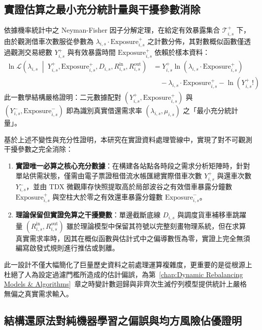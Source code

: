 \subsection{實證估算之最小充分統計量與干擾參數消除}

依據機率統計中之 Neyman-Fisher 因子分解定理，在給定有效暴露集合 $\mathcal{T}^+_{i,s}$ 下，由於觀測借車次數服從參數為 $\lambda_{i,s} \cdot \text{Exposure}^+_{i,s}$ 之計數分佈，其對數概似函數僅透過觀測交易總數 $Y^+_{i,s}$ 與有效暴露時間 $\text{Exposure}^+_{i,s}$ 依賴於樣本資料：
\begin{equation}
\begin{aligned}
\ln \mathcal{L}\left(\lambda_{i,s} \;\middle|\; Y^+_{i,s}, \text{Exposure}^+_{i,s}, D_{i,s}, R^{\text{in}}_{i,s}, R^{\text{out}}_{i,s}\right) &= Y^+_{i,s} \ln\left(\lambda_{i,s} \cdot \text{Exposure}^+_{i,s}\right) \\
&\quad - \lambda_{i,s} \cdot \text{Exposure}^+_{i,s} - \ln\left(Y^+_{i,s}!\right)
\end{aligned}
\end{equation}
此一數學結構嚴格證明：二元數據配對 $\left(Y^+_{i,s}, \text{Exposure}^+_{i,s}\right)$ 與 $\left(Y^-_{i,s}, \text{Exposure}^-_{i,s}\right)$ 即為識別真實借還需求率 $\left(\lambda_{i,s}, \mu_{i,s}\right)$ 之「最小充分統計量」。

基於上述不變性與充分性證明，本研究在實證資料處理管線中，實現了對不可觀測干擾參數之完全消除：
\begin{enumerate}
    \item \textbf{實證唯一必算之核心充分數據}：在構建各站點各時段之需求分析矩陣時，針對單站供需狀態，僅需由電子票證租借流水帳匯總實際借車次數 $Y^+_{i,s}$ 與還車次數 $Y^-_{i,s}$，並由 TDX 微觀庫存快照提取高於局部波谷之有效借車暴露分鐘數 $\text{Exposure}^+_{i,s}$ 與空柱大於零之有效還車暴露分鐘數 $\text{Exposure}^-_{i,s}$。
    \item \textbf{理論保留但實證免算之干擾變數}：單邊截斷底線 $D_{i,s}$ 與調度貨車補移車跳躍量 $\left(R^{\text{in}}_{i,s}, R^{\text{out}}_{i,s}\right)$ 雖於理論模型中保留其符號以完整刻畫物理系統，但在求算真實需求率時，因其在概似函數與估計式中之偏導數恆為零，實證上完全無須編寫啟發式規則進行推估或剝離。
\end{enumerate}
此一設計不僅大幅簡化了巨量歷史資料之前處理運算複雜度，更重要的是從根源上杜絕了人為設定過濾門檻所造成的估計偏誤，為第~\ref{chap:Dynamic Rebalancing Models & Algorithms}~章之時變計數迴歸與非齊次生滅佇列模型提供統計上嚴格無偏之真實需求輸入。

\subsection{結構還原法對純機器學習之偏誤與均方風險佔優證明}\label{subsec:ml_strict_dominance_proof}

